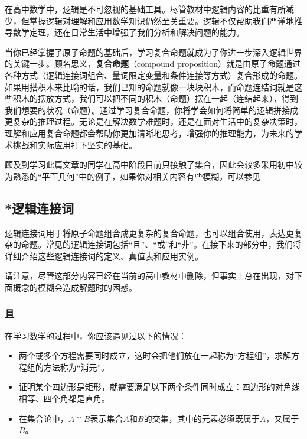 
\begin{issues}
\issueDraft
\end{issues}


在高中数学中，逻辑是不可忽视的基础工具。尽管教材中逻辑内容的比重有所减少，但掌握逻辑对理解和应用数学知识仍然至关重要。逻辑不仅帮助我们严谨地推导数学定理，还在日常生活中增强了我们分析和解决问题的能力。

当你已经掌握了原子命题的基础后，学习复合命题就成为了你进一步深入逻辑世界的关键一步。顾名思义，\textbf{复合命题}（compound proposition）就是由原子命题通过各种方式（逻辑连接词组合、量词限定变量和条件连接等方式）复合形成的命题。如果用搭积木来比喻的话，我们已知的命题就像一块块积木，而命题连结词就是这些积木的摆放方式，我们可以把不同的积木（命题）摆在一起（连结起来），得到我们想要的状况（命题）。通过学习复合命题，你将学会如何将简单的逻辑拼接成更复杂的推理过程。无论是在解决数学难题时，还是在面对生活中的复杂决策时，理解和应用复合命题都会帮助你更加清晰地思考，增强你的推理能力，为未来的学术挑战和实际应用打下坚实的基础。

顾及到学习此篇文章的同学在高中阶段目前只接触了集合，因此会较多采用初中较为熟悉的“平面几何”中的例子，如果你对相关内容有些模糊，可以参见

\subsection{*逻辑连接词}

逻辑连接词用于将原子命题组合成更复杂的复合命题，也可以组合使用，表达更复杂的命题。常见的逻辑连接词包括“且”、“或”和“非”。在接下来的部分中，我们将详细介绍这些逻辑连接词的定义、真值表和应用实例。

请注意，尽管这部分内容已经在当前的高中教材中删除，但事实上总在出现，对下面概念的模糊会造成解题时的困惑。

\subsubsection{且}

在学习数学的过程中，你应该遇见过以下的情况：
\begin{itemize}
\item 两个或多个方程需要同时成立，这时会把他们放在一起称为“方程组”，求解方程组的方法称为“消元”。
\item 证明某个四边形是矩形，就需要满足以下两个条件同时成立：四边形的对角线相等、四个角都是直角。
\item 在集合论中，$A \cap B$表示集合$A$和$B$的交集，其中的元素必须既属于$A$，又属于$B$。
\end{itemize}

